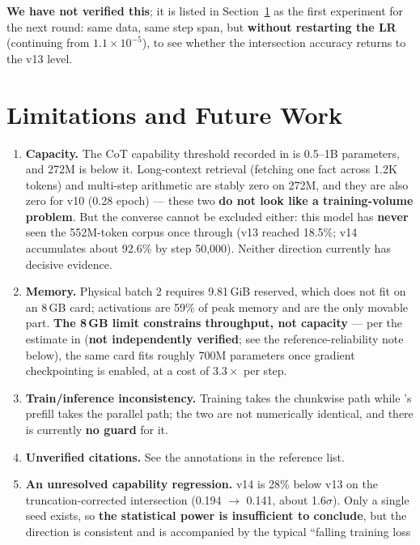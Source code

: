\documentclass[11pt,openany]{article}
\begin{document}
\textbf{We have not verified this}; it is listed in Section~\ref{sec:en-limits} as the first
experiment for the next round: same data, same step span, but \textbf{without restarting the
LR} (continuing from $1.1\times10^{-5}$), to see whether the intersection accuracy returns to
the v13 level.

\section{Limitations and Future Work}
\label{sec:en-limits}

\begin{enumerate}
\item \textbf{Capacity.} The CoT capability threshold recorded in  is 0.5--1B
      parameters, and 272M is below it. Long-context retrieval (fetching one fact across
      1.2K tokens) and multi-step arithmetic are stably zero on 272M, and they are also zero
      for v10 (0.28 epoch) --- these two \textbf{do not look like a training-volume problem}.
      But the converse cannot be excluded either: this model has \textbf{never} seen the
      552M-token corpus once through (v13 reached 18.5\%; v14 accumulates about 92.6\% by step
      50,000). Neither direction currently has decisive evidence.
\item \textbf{Memory.} Physical batch 2 requires 9.81\,GiB reserved, which does not fit on an
      8\,GB card; activations are 59\% of peak memory and are the only movable part.
      \textbf{The 8\,GB limit constrains throughput, not capacity} --- per the estimate in
       (\textbf{not independently verified}; see the reference-reliability note
      below), the same card fits roughly 700M parameters once gradient checkpointing is
      enabled, at a cost of $3.3\times$ per step.
\item \textbf{Train/inference inconsistency.} Training takes the chunkwise path while
      's prefill takes the parallel path; the two are not numerically
      identical, and there is currently \textbf{no guard} for it.
\item \textbf{Unverified citations.} See the annotations in the reference list.
\item \textbf{An unresolved capability regression.} v14 is 28\% below v13 on the
      truncation-corrected intersection (0.194 $\rightarrow$ 0.141, about 1.6$\sigma$). Only a
      single seed exists, so \textbf{the statistical power is insufficient to conclude}, but
      the direction is consistent and is accompanied by the typical ``falling training loss

\end{enumerate}
\end{document}
